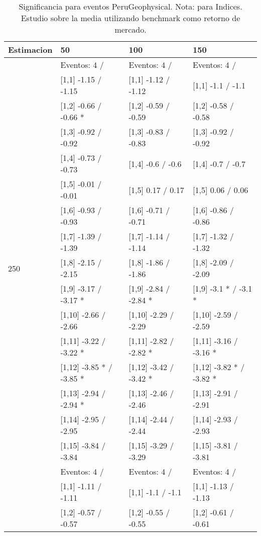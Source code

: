 \begin{table}

\caption{Significancia para eventos PeruGeophysical. Nota: para Indices. Estudio sobre la media utilizando benchmark como retorno de mercado.}
\centering
\begin{tabular}[t]{llll}
\toprule
Estimacion & 50 & 100 & 150\\
\midrule
 & Eventos:  4 / & Eventos:  4 / & Eventos:  4 /\\
 & {}[1,1] -1.15  / -1.15 & {}[1,1] -1.12  / -1.12 & {}[1,1] -1.1  / -1.1\\
 & {}[1,2] -0.66  / -0.66 * & {}[1,2] -0.59  / -0.59 & {}[1,2] -0.58  / -0.58\\
 & {}[1,3] -0.92  / -0.92 & {}[1,3] -0.83  / -0.83 & {}[1,3] -0.92  / -0.92\\
 & {}[1,4] -0.73  / -0.73 & {}[1,4] -0.6  / -0.6 & {}[1,4] -0.7  / -0.7\\
\addlinespace
 & {}[1,5] -0.01  / -0.01 & {}[1,5] 0.17  / 0.17 & {}[1,5] 0.06  / 0.06\\
 & {}[1,6] -0.93  / -0.93 & {}[1,6] -0.71  / -0.71 & {}[1,6] -0.86  / -0.86\\
 & {}[1,7] -1.39  / -1.39 & {}[1,7] -1.14  / -1.14 & {}[1,7] -1.32  / -1.32\\
250 & {}[1,8] -2.15  / -2.15 & {}[1,8] -1.86  / -1.86 & {}[1,8] -2.09  / -2.09\\
 & {}[1,9] -3.17  / -3.17 * & {}[1,9] -2.84  / -2.84 * & {}[1,9] -3.1 * / -3.1 *\\
\addlinespace
 & {}[1,10] -2.66  / -2.66 & {}[1,10] -2.29  / -2.29 & {}[1,10] -2.59  / -2.59\\
 & {}[1,11] -3.22  / -3.22 * & {}[1,11] -2.82  / -2.82 * & {}[1,11] -3.16  / -3.16 *\\
 & {}[1,12] -3.85 * / -3.85 * & {}[1,12] -3.42  / -3.42 * & {}[1,12] -3.82 * / -3.82 *\\
 & {}[1,13] -2.94  / -2.94 * & {}[1,13] -2.46  / -2.46 & {}[1,13] -2.91  / -2.91\\
 & {}[1,14] -2.95  / -2.95 & {}[1,14] -2.44  / -2.44 & {}[1,14] -2.93  / -2.93\\
\addlinespace
 & {}[1,15] -3.84  / -3.84 & {}[1,15] -3.29  / -3.29 & {}[1,15] -3.81  / -3.81\\
 & Eventos:  4 / & Eventos:  4 / & Eventos:  4 /\\
 & {}[1,1] -1.11  / -1.11 & {}[1,1] -1.1  / -1.1 & {}[1,1] -1.13  / -1.13\\
 & {}[1,2] -0.57  / -0.57 & {}[1,2] -0.55  / -0.55 & {}[1,2] -0.61  / -0.61\\

\end{tabular}
\end{table}
